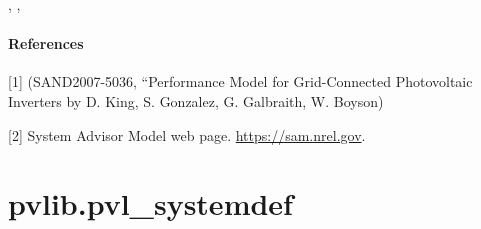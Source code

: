 \documentclass[letterpaper,10pt,english]{sphinxmanual}
\begin{document}
\begin{fulllineitems}
\begin{quote}
\begin{description}
\end{description}\end{quote}




{\hyperref[stubs/pvlib.pvl_sapm:pvlib.pvl_sapm]{}}, , {\hyperref[stubs/pvlib.pvl_singlediode:pvlib.pvl_singlediode]{}}


\paragraph{References}

{[}1{]} (SAND2007-5036, ``Performance Model for Grid-Connected Photovoltaic 
Inverters by D. King, S. Gonzalez, G. Galbraith, W. Boyson)

{[}2{]} System Advisor Model web page. \href{https://sam.nrel.gov}{https://sam.nrel.gov}.

\end{fulllineitems}



\section{pvlib.pvl\_systemdef}
\label{stubs/pvlib.pvl_systemdef::doc}\label{stubs/pvlib.pvl_systemdef:pvlib-pvl-systemdef}
\end{document}
